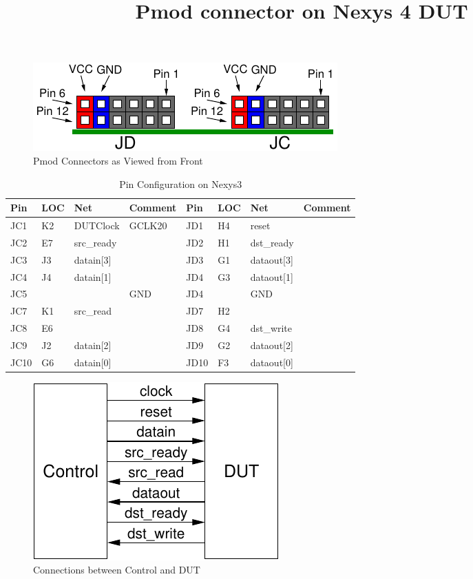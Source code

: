 \documentclass{article}
\begin{document}
\title{Pmod connector on Nexys 4 DUT}

\maketitle

\begin{figure}[ht]
  \begin{center}
    \includegraphics[scale=1]{figures/pmod_connector}
    \caption{Pmod Connectors as Viewed from Front}
  \end{center}
\end{figure}

\begin{table}[ht]
  \begin{center}
    \caption{Pin Configuration on Nexys3}
    \begin{tabular}{llll|llll}
      Pin  & LOC & Net         & Comment & Pin  & LOC & Net        & Comment \\ \hline
       JC1 & K2  & DUTClock       & GCLK20  &  JD1 & H4 & reset      & \\
       JC2 & E7  & src\_ready  &         &  JD2 & H1 & dst\_ready & \\
       JC3 & J3  & datain[3]   &         &  JD3 & G1 & dataout[3] & \\
       JC4 & J4  & datain[1]   &         &  JD4 & G3 & dataout[1] & \\
       JC5 &     &             & GND     &  JD4 &    & GND        & \\
       JC7 & K1  & src\_read   &         &  JD7 & H2 &            & \\
       JC8 & E6  &             &         &  JD8 & G4 & dst\_write  & \\
       JC9 & J2  & datain[2]   &         &  JD9 & G2 & dataout[2] & \\
      JC10 & G6  & datain[0]   &         & JD10 & F3 & dataout[0] & \\
    \end{tabular}
  \end{center}
\end{table}

\begin{figure}[ht]
  \begin{center}
    \includegraphics[scale=1]{figures/ctrl-dut_connections}
    \caption{Connections between Control and DUT}
  \end{center}
\end{figure}
\end{document}
